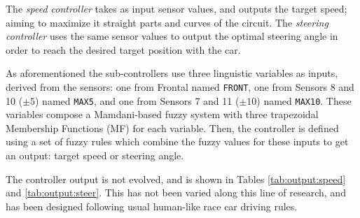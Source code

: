 \documentclass[10pt,journal,compsoc]{IEEEtran}
\begin{document}
The \textit{speed controller} takes as input sensor values, and
outputs the target speed; aiming to maximize it straight parts and curves of the circuit. The \textit{steering controller} uses the same sensor values to output the optimal steering angle in order to reach the desired target position with the car.

As aforementioned the sub-controllers use three linguistic variables as inputs, derived from the sensors: one from Frontal named \texttt{FRONT}, one from Sensors 8 and 10 ($\pm 5$\textdegree) named \texttt{MAX5}, and one from Sensors 7 and 11 ($\pm 10$\textdegree) named \texttt{MAX10}. These variables compose a Mamdani-based fuzzy system \cite{iancu2012} with three trapezoidal Membership Functions (MF) for each variable.
Then, the controller is defined using a set of fuzzy rules which combine the fuzzy values for these inputs to get an output: target speed or steering angle.

The controller output is not evolved, and is shown in Tables \ref{tab:output:speed} and \ref{tab:output:steer}. This has not been
varied along this line of research, and has been designed following
usual human-like race car driving rules. 
\end{document}
